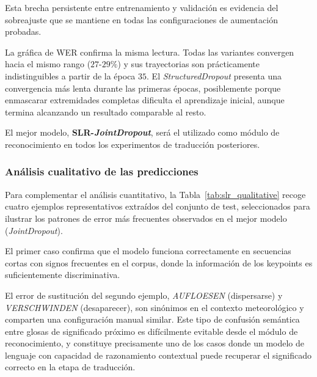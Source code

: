 Esta brecha persistente entre entrenamiento y validación es evidencia del sobreajuste que se mantiene en todas las configuraciones de aumentación probadas.

La gráfica de WER confirma la misma lectura.
Todas las variantes convergen hacia el mismo rango ($27$-$29\%$) y sus trayectorias son prácticamente indistinguibles a partir de la época $35$.
El \textit{StructuredDropout} presenta una convergencia más lenta durante las primeras épocas, posiblemente porque enmascarar extremidades completas dificulta el aprendizaje inicial, aunque termina alcanzando un resultado comparable al resto.




El mejor modelo, \textbf{SLR-\textit{JointDropout}}, será el utilizado como módulo de reconocimiento en todos los experimentos de traducción posteriores.

\subsubsection*{Análisis cualitativo de las predicciones}

Para complementar el análisis cuantitativo, la Tabla~\ref{tab:slr_qualitative} recoge cuatro ejemplos representativos extraídos del conjunto de test, seleccionados para ilustrar los patrones de error más frecuentes observados en el mejor modelo (\textit{JointDropout}).

El primer caso confirma que el modelo funciona correctamente en secuencias cortas con signos frecuentes en el corpus, donde la información de los keypoints es suficientemente discriminativa.

El error de sustitución del segundo ejemplo, \textit{AUFLOESEN} (dispersarse) y \textit{VERSCHWINDEN} (desaparecer), son sinónimos en el contexto meteorológico y comparten una configuración manual similar.
Este tipo de confusión semántica entre glosas de significado próximo es difícilmente evitable desde el módulo de reconocimiento, y constituye precisamente uno de los casos donde un modelo de lenguaje con capacidad de razonamiento contextual puede recuperar el significado correcto en la etapa de traducción.

